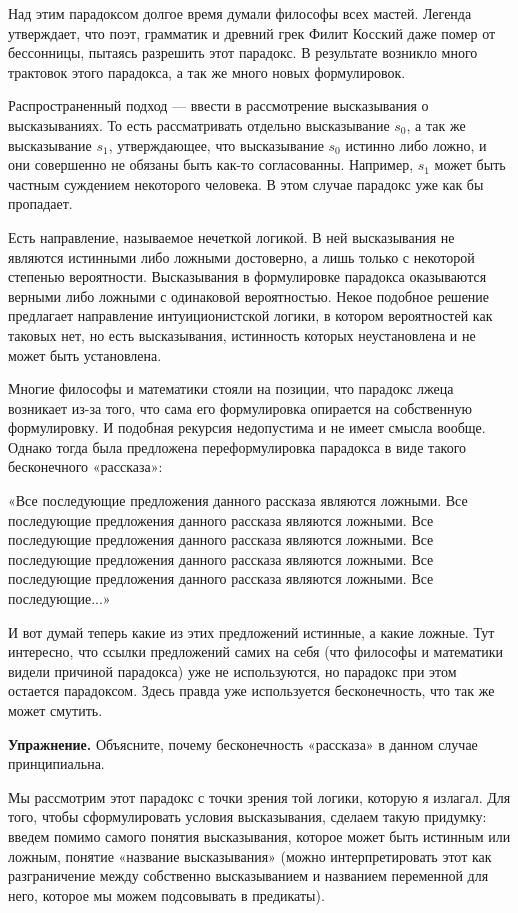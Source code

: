 Над этим парадоксом долгое время думали философы всех мастей. Легенда утверждает, что поэт, грамматик и древний грек Филит Косский даже помер от бессонницы, пытаясь разрешить этот парадокс. В результате возникло много трактовок этого парадокса, а так же много новых формулировок.

Распространенный подход — ввести в рассмотрение высказывания о высказываниях. То есть рассматривать отдельно высказывание $s_0$, а так же высказывание $s_1$, утверждающее, что высказывание $s_0$ истинно либо ложно, и они совершенно не обязаны быть как-то согласованны. Например, $s_1$ может быть частным суждением некоторого человека. В этом случае парадокс уже как бы пропадает.

Есть направление, называемое нечеткой логикой. В ней высказывания не являются истинными либо ложными достоверно, а лишь только с некоторой степенью вероятности. Высказывания в формулировке парадокса оказываются верными либо ложными с одинаковой вероятностью. Некое подобное решение предлагает направление интуиционистской логики, в котором вероятностей как таковых нет, но есть высказывания, истинность которых неустановлена и не может быть установлена.

Многие философы и математики стояли на позиции, что парадокс лжеца возникает из-за того, что сама его формулировка опирается на собственную формулировку. И подобная рекурсия недопустима и не имеет смысла вообще. Однако тогда была предложена переформулировка парадокса в виде такого бесконечного «рассказа»:

«Все последующие предложения данного рассказа являются ложными. Все последующие предложения данного рассказа являются ложными. Все последующие предложения данного рассказа являются ложными. Все последующие предложения данного рассказа являются ложными. Все последующие предложения данного рассказа являются ложными. Все последующие...»

И вот думай теперь какие из этих предложений истинные, а какие ложные. Тут интересно, что ссылки предложений самих на себя (что философы и математики видели причиной парадокса) уже не используются, но парадокс при этом остается парадоксом. Здесь правда уже используется бесконечность, что так же может смутить.

{\bfseries Упражнение.} Объясните, почему бесконечность «рассказа» в данном случае принципиальна.

Мы рассмотрим этот парадокс с точки зрения той логики, которую я излагал. Для того, чтобы сформулировать условия высказывания, сделаем такую придумку: введем помимо самого понятия высказывания, которое может быть истинным или ложным, понятие «название высказывания» (можно интерпретировать этот как разграничение между собственно высказыванием и названием переменной для него, которое мы можем подсовывать в предикаты).


